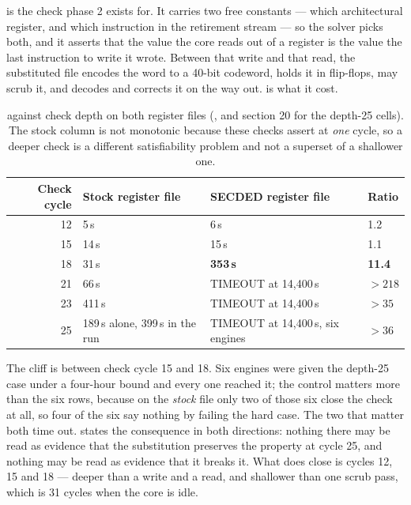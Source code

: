  is the check phase 2 exists for. It carries two free
constants --- which architectural register, and which instruction in the
retirement stream --- so the solver picks both, and it asserts that the
value the core reads out of a register is the value the last instruction
to write it wrote. Between that write and that read, the substituted file
encodes the word to a 40-bit codeword, holds it in flip-flops, may scrub
it, and decodes and corrects it on the way out. 
is what it cost.

\begin{table}[tbp]
\centering
\caption{ against check depth on both register files
(, and section 20 for the depth-25 cells). The
stock column is not monotonic because these checks assert at \emph{one}
cycle, so a deeper check is a different satisfiability problem and not a
superset of a shallower one.}
\label{tab:verif-regch0}
\small
\begin{tabular}{@{}rlll@{}}
\toprule
Check cycle & Stock register file & SECDED register file & Ratio \\
\midrule
12 & 5\,s   & 6\,s                       & 1.2 \\
15 & 14\,s  & 15\,s                      & 1.1 \\
18 & 31\,s  & \textbf{353\,s}            & \textbf{11.4} \\
21 & 66\,s  & TIMEOUT at 14{,}400\,s     & $>218$ \\
23 & 411\,s & TIMEOUT at 14{,}400\,s     & $>35$ \\
25 & 189\,s alone, 399\,s in the run & TIMEOUT at 14{,}400\,s, six engines & $>36$ \\
\bottomrule
\end{tabular}
\end{table}

The cliff is between check cycle 15 and 18. Six engines were given the
depth-25 case under a four-hour bound and every one reached it; the
control matters more than the six rows, because on the \emph{stock} file
only two of those six close the check at all, so four of the six say
nothing by failing the hard case. The two that matter both time out.
 states the consequence in both directions:
nothing there may be read as evidence that the substitution preserves the
property at cycle 25, and nothing may be read as evidence that it breaks
it. What does close is cycles 12, 15 and 18 --- deeper than a write and a
read, and shallower than one scrub pass, which is 31 cycles when the core
is idle.

